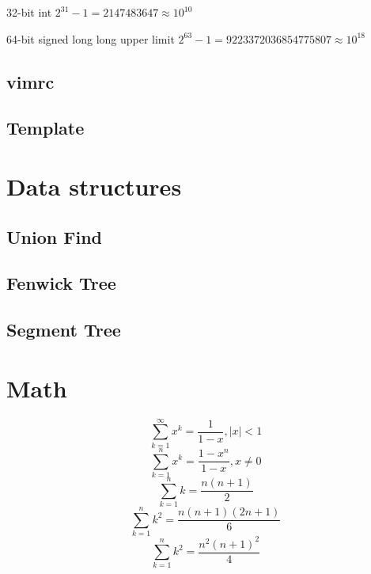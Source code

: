 \documentclass[a4paper,landscape,8pt]{article}
\begin{document}
\begin{multicols}{2}
32-bit int $2^{31} - 1 = 2147483647 \approx 10^{10}$

64-bit signed long long upper limit $2^{63} - 1 = 9223372036854775807 \approx 10^{18}$

\subsection{vimrc}


\subsection{Template}




\section{Data structures}

\subsection{Union Find}


\subsection{Fenwick Tree}


\subsection{Segment Tree}



\section{Math}


\[
  \sum_{k=1}^{\infty} x^k = \frac{1}{1-x}, \vert x \vert < 1
\]
\[
  \sum_{k=1}^{n} x^k = \frac{1-x^n}{1-x}, x \neq 0
\]
\[
  \sum_{k=1}^{n} k = \frac{n(n+1)}{2}
\]
\[
  \sum_{k=1}^{n} k^2 = \frac{n(n+1)(2n+1)}{6}
\]
\[
  \sum_{k=1}^{n} k^2 = \frac{n^2(n+1)^2}{4}
\]


\end{multicols}
\end{document}
